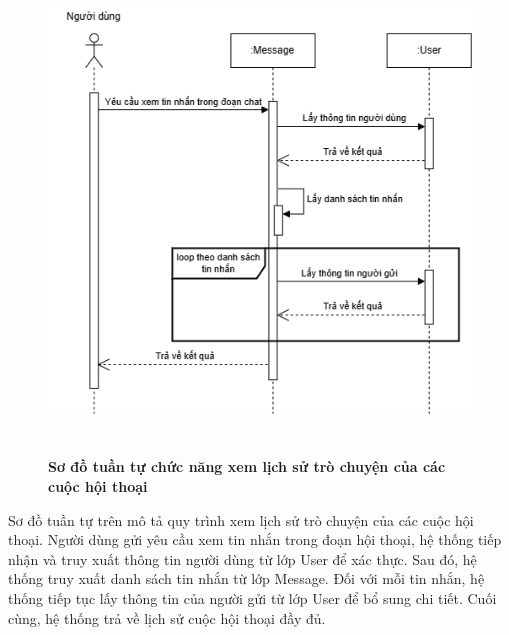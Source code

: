 \begin{figure}[H]
	\centering
	\includegraphics[width=14cm,height=12.8cm]{Images/sequence/chat/load.drawio.png}
	\caption[Sơ đồ tuần tự chức năng xem lịch sử trò chuyện của các cuộc hội thoại]{\bfseries \fontsize{12pt}{0pt}
		\selectfont Sơ đồ tuần tự chức năng xem lịch sử trò chuyện của các cuộc hội thoại}
	\label{sequence_get_mess} %
\end{figure}
Sơ đồ tuần tự trên mô tả quy trình xem lịch sử trò chuyện của các cuộc hội thoại. Người dùng gửi yêu cầu xem tin nhắn trong đoạn hội thoại, hệ thống tiếp nhận và truy xuất thông tin người dùng từ lớp User để xác thực.
Sau đó, hệ thống truy xuất danh sách tin nhắn từ lớp Message. Đối với mỗi tin nhắn, hệ thống tiếp tục lấy thông tin của người gửi từ lớp User để bổ sung chi tiết. Cuối cùng, hệ thống trả về lịch sử cuộc hội thoại đầy đủ.


